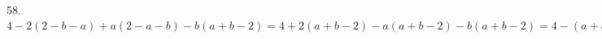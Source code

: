 58. $4-2(2-b-a)+a(2-a-b)-b(a+b-2)=4+2(a+b-2)-a(a+b-2)-b(a+b-2)=4-(a+b-2)(a+b-2)=4-(a+b-2)^2=(2-a-b+2)(2+a+b-2)=(a+b)(4-a-b).$\\
